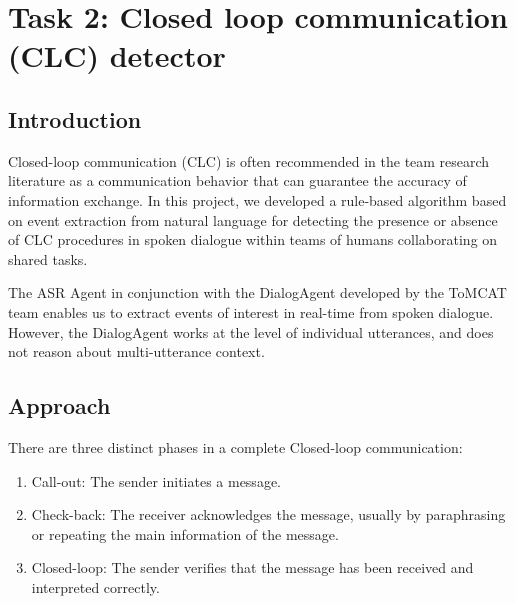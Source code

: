 \section{Task 2: Closed loop communication (CLC) detector}
\subsection{Introduction}

Closed-loop communication (CLC) is often recommended in the team research
literature as a communication behavior that can guarantee the accuracy of
information exchange. In this project, we developed a rule-based algorithm
based on event extraction from natural language for detecting the presence or
absence of CLC procedures in spoken dialogue within teams of humans
collaborating on shared tasks.

The ASR Agent in conjunction with the DialogAgent developed by the ToMCAT team
enables us to extract events of interest in real-time from spoken dialogue.
However, the DialogAgent works at the level of individual utterances, and does
not reason about multi-utterance context. 

\subsection{Approach}

There are three distinct phases in a complete Closed-loop communication:

\begin{enumerate}
    \item Call-out: The sender initiates a message.
    \item Check-back: The receiver acknowledges the message, usually by
        paraphrasing or repeating the main information of the message.
    \item Closed-loop: The sender verifies that the message has been received
        and interpreted correctly.
\end{enumerate}

